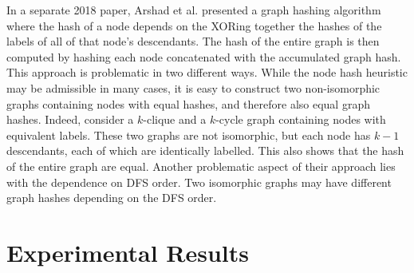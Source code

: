 \documentclass{svproc}
\begin{document}
In a separate 2018 paper, Arshad et al. \cite{Arshad2018-ij} presented a graph hashing algorithm where the hash of a node depends on the XORing together the hashes of the labels of all of that node's descendants. The hash of the entire graph is then computed by hashing each node concatenated with the accumulated graph hash. This approach is problematic in two different ways. While the node hash heuristic may be admissible in many cases, it is easy to construct two non-isomorphic graphs containing nodes with equal hashes, and therefore also equal graph hashes. Indeed, consider a $k$-clique and a $k$-cycle graph containing nodes with equivalent labels. These two graphs are not isomorphic, but each node has $k-1$ descendants, each of which are identically labelled. This also shows that the hash of the entire graph are equal. Another problematic aspect of their approach lies with the dependence on DFS order. Two isomorphic graphs may have different graph hashes depending on the DFS order.

\section{Experimental Results}

%
%
%








\end{document}
